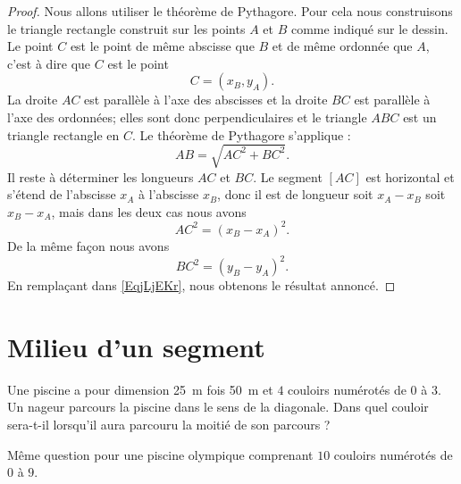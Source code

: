 \begin{proof}
    Nous allons utiliser le théorème de Pythagore. Pour cela nous construisons le triangle rectangle construit sur les points \( A\) et \( B\) comme indiqué sur le dessin. Le point \( C\) est le point de même abscisse que \( B\) et de même ordonnée que \( A\), c'est à dire que \( C\) est le point
    \begin{equation}
        C=(x_B,y_A).
    \end{equation}
    La droite \( AC\) est parallèle à l'axe des abscisses et la droite \( BC\) est parallèle à l'axe des ordonnées; elles sont donc perpendiculaires et le triangle \( ABC\) est un triangle rectangle en \( C\). Le théorème de Pythagore s'applique :
    \begin{equation}    \label{EqjLjEKr}
       AB =\sqrt{ AC^2+BC^2}.
    \end{equation}
    Il reste à déterminer les longueurs \(  AC \) et \(  BC \). Le segment \( [AC]\) est horizontal et s'étend de l'abscisse \( x_A\) à l'abscisse \( x_B\), donc il est de longueur soit \( x_A-x_B\) soit \( x_B-x_A\), mais dans les deux cas nous avons
    \begin{equation}
         AC^2=(x_B-x_A)^2.
    \end{equation}
    De la même façon nous avons 
    \begin{equation}
         BC^2=(y_B-y_A)^2.
    \end{equation}
    En remplaçant dans \eqref{EqjLjEKr}, nous obtenons le résultat annoncé.
\end{proof}

\section{Milieu d'un segment}


    Une piscine a pour dimension \SI{25}{\meter} fois \SI{50}{\meter} et \( 4\) couloirs numérotés de \( 0\) à \( 3\). Un nageur parcours la piscine dans le sens de la diagonale. Dans quel couloir sera-t-il lorsqu'il aura parcouru la moitié de son parcours ?

    Même question pour une piscine olympique comprenant \( 10\) couloirs numérotés de \( 0\) à \( 9\).

    
    \vspace{1cm}

